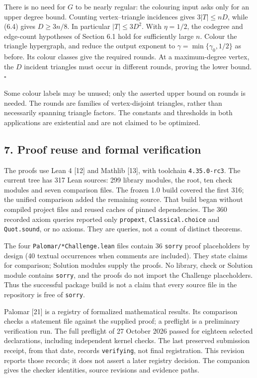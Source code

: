 \documentclass[english,11pt,a4paper]{article}
\begin{document}
There is no need for \(G\) to be nearly regular: the colouring input asks only for an upper degree bound. Counting vertex--triangle incidences gives \(3|T|\le nD\), while (6.4) gives \(D\ge3n/8\). In particular \(|T|\le3D^2\). With \(\eta=1/2\), the codegree and edge-count hypotheses of Section 6.1 hold for sufficiently large \(n\). Colour the triangle hypergraph, and reduce the output exponent to \(\gamma=\min\{\gamma_0,1/2\}\) as before. Its colour classes give the required rounds. At a maximum-degree vertex, the \(D\) incident triangles must occur in different rounds, proving the lower bound. \(\square\)

Some colour labels may be unused; only the asserted upper bound on rounds is needed. The rounds are families of vertex-disjoint triangles, rather than necessarily spanning triangle factors. The constants and thresholds in both applications are existential and are not claimed to be optimized.

\subsection{7. Proof reuse and formal verification}\label{proof-reuse-and-formal-verification}

The proofs use Lean 4 {[}12{]} and Mathlib {[}13{]}, with toolchain \texttt{4.\allowbreak{}35.\allowbreak{}0-rc3}. The current tree has 317 Lean sources: 299 library modules, the root, ten check modules and seven comparison files. The frozen 1.0 build covered the first 316; the unified comparison added the remaining source. That build began without compiled project files and reused caches of pinned dependencies. The 360 recorded axiom queries reported only \texttt{propext}, \texttt{Classical.\allowbreak{}choice} and \texttt{Quot.\allowbreak{}sound}, or no axioms. They are queries, not a count of distinct theorems.

The four \texttt{Palomar/\allowbreak{}*Challenge.\allowbreak{}lean} files contain 36 \texttt{sorry} proof placeholders by design (40 textual occurrences when comments are included). They state claims for comparison; Solution modules supply the proofs. No library, check or Solution module contains \texttt{sorry}, and the proofs do not import the Challenge placeholders. Thus the successful package build is not a claim that every source file in the repository is free of \texttt{sorry}.

Palomar {[}21{]} is a registry of formalized mathematical results. Its comparison checks a statement file against the supplied proof; a preflight is a preliminary verification run. The full preflight of 27 October 2026 passed for eighteen selected declarations, including independent kernel checks. The last preserved submission receipt, from that date, records \texttt{verifying}, not final registration. This revision reports those records; it does not assert a later registry decision. The companion gives the checker identities, source revisions and evidence paths.
\end{document}
